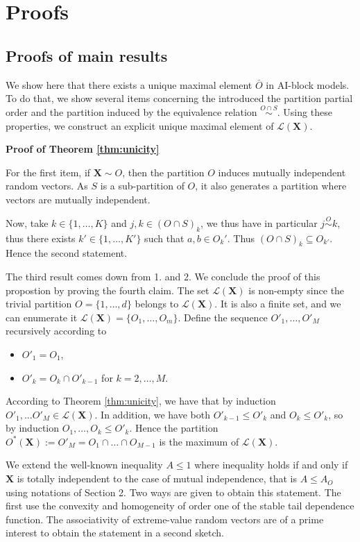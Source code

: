 \documentclass[11pt]{article}
\makeatletter
\renewenvironment{proof}[1][\proofname]{\par
\pushQED{\qed}%
\normalfont \topsep6\p@\@plus6\p@\relax
\trivlist
\item\relax
{\textbf{
#1\@addpunct{ }}}\hspace\labelsep\ignorespaces
}{%
\popQED\endtrivlist\@endpefalse
}
\makeatother
\begin{document}
    \appendix
    \section{Proofs}
    \label{sec:proof}
        \subsection{Proofs of  main results}
        \label{subsec:main_results}
		We show here that there exists a unique maximal element $\bar{O}$ in AI-block models. To do that, we show several items concerning the introduced the partition partial order and the partition induced by the equivalence relation $\overset{O \cap S}{\sim}$. Using these properties, we construct an explicit unique maximal element of $\mathcal{L}(\textbf{X})$.
		\begin{proof}[Proof of Theorem \ref{thm:unicity}]
		For the first item, if $\textbf{X} \sim O$, then the partition $O$ induces mutually independent random vectors. As $S$ is a sub-partition of $O$, it also generates a partition where vectors are mutually independent.
		
		Now, take $k \in \{1,\dots,K\}$ and $j,k \in (O \cap S)_k$, we thus have in particular $j \overset{O}{\sim} k$, thus there exists $k' \in \{1,\dots, K'\}$ such that $a,b \in O_k'$. Thus $(O \cap S)_k \subseteq O_{k'}$. Hence the second statement.
		
		The third result comes down from 1. and 2. We conclude the proof of this propostion by proving the fourth claim. The set $\mathcal{L}(\textbf{X})$ is non-empty since the trivial partition $O = \{1,\dots,d\}$ belongs to $\mathcal{L}(\textbf{X})$. It is also a finite set, and we can enumerate it $\mathcal{L}(\textbf{X}) = \{O_1, \dots, O_m\}$. Define the sequence $O'_1, \dots, O'_M$ recursively according to
		\begin{itemize}
			\item $O'_1 = O_1$,
			\item $O'_k = O_k \cap O'_{k-1}$ for $k = 2,\dots, M$.
		\end{itemize}
		According to Theorem \ref{thm:unicity}, we have that by induction $O'_1, \dots O'_M \in \mathcal{L}(\textbf{X})$. In addition, we have both $O'_{k-1} \leq O'_k$ and $O_k \leq O'_k$, so by induction $O_1, \dots, O_k \leq O'_k$. Hence the partition $O^*(\textbf{X}) := O'_M = O_1 \cap \dots  \cap O_{M-1}$ is the maximum of $\mathcal{L}(\textbf{X})$.
	\end{proof}
	
	We extend the well-known inequality $A \leq 1$ where inequality holds if and only if $\textbf{X}$ is totally independent to the case of mutual independence, that is $A \leq A_{O}$ using notations of Section 2. Two ways are given to obtain this statement. The first use the convexity and homogeneity of order one of the stable tail dependence function. The associativity of extreme-value random vectors are of a prime interest to obtain the statement in a second sketch.
	
\end{document}

